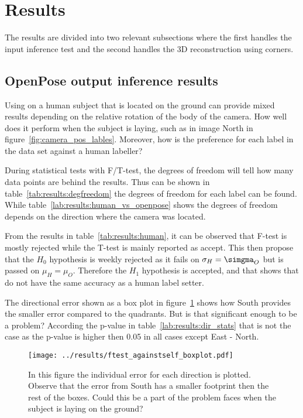 \section{Results}\label{sec:results}


The results are divided into two relevant subsections where the first handles the input inference test and the second handles the 3D reconstruction using \aruco corners.
\subsection{OpenPose output inference results}%
\label{sub:res:op_inference}
Using \openpose{ } on a human subject that is located on the ground can provide mixed results depending on the relative rotation of the body of the camera.
How well does it perform when the subject is laying, such as in image North in figure~\ref{fig:camera_pos_lables}.
Moreover, how is the preference for each label in the \operpose data set against a human labeller?

During statistical tests with F/T-test, the degrees of freedom will tell how many data points are behind the results.
Thus can be shown in table~\ref{tab:results:degfreedom} the degrees of freedom for each label can be found.
While table~\ref{lab:results:human_vs_openpose} shows the degrees of freedom depends on the direction where the camera was located.

From the results in table~\ref{tab:results:human}, it can be observed that F-test is mostly rejected while the T-test is mainly reported as accept.
This then propose that the $H_0$ hypothesis is weekly rejected as it fails on $\sigma_H = \simgma_O$ but is passed on $\mu_H = \mu_O$.
Therefore the $H_1$ hypothesis is accepted, and that shows that \openpose{ } do not have the same accuracy as a human label setter.

The directional error shown as a box plot in figure~\ref{fig:results:dirbox} shows how South provides the smaller error compared to the quadrants.
But is that significant enough to be a problem?
According the p-value in table~\ref{lab:results:dir_stats} that is not the case as the p-value is higher then 0.05 in all cases except East - North.

\begin{figure}
\begin{center}
    \texttt{[image: ../results/ftest\_againstself\_boxplot.pdf]}
\end{center}
\caption{In this figure the individual error for each direction is plotted. Observe that the error from South has a smaller footprint then the rest of the boxes. Could this be a part of the problem \openpose faces when the subject is laying on the ground? }
\label{fig:results:dirbox}
\end{figure}



